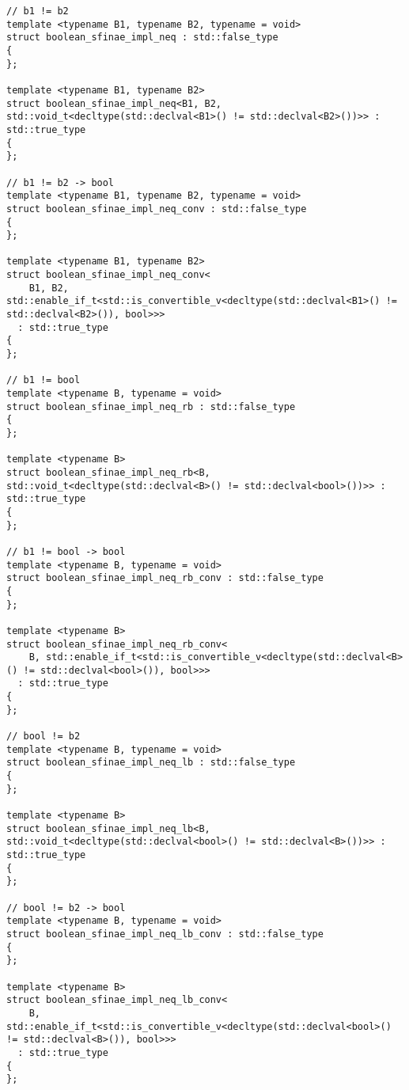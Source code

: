 \begin{verbatim}
// b1 != b2
template <typename B1, typename B2, typename = void>
struct boolean_sfinae_impl_neq : std::false_type
{
};

template <typename B1, typename B2>
struct boolean_sfinae_impl_neq<B1, B2, std::void_t<decltype(std::declval<B1>() != std::declval<B2>())>> : std::true_type
{
};

// b1 != b2 -> bool
template <typename B1, typename B2, typename = void>
struct boolean_sfinae_impl_neq_conv : std::false_type
{
};

template <typename B1, typename B2>
struct boolean_sfinae_impl_neq_conv<
    B1, B2, std::enable_if_t<std::is_convertible_v<decltype(std::declval<B1>() != std::declval<B2>()), bool>>>
  : std::true_type
{
};

// b1 != bool
template <typename B, typename = void>
struct boolean_sfinae_impl_neq_rb : std::false_type
{
};

template <typename B>
struct boolean_sfinae_impl_neq_rb<B, std::void_t<decltype(std::declval<B>() != std::declval<bool>())>> : std::true_type
{
};

// b1 != bool -> bool
template <typename B, typename = void>
struct boolean_sfinae_impl_neq_rb_conv : std::false_type
{
};

template <typename B>
struct boolean_sfinae_impl_neq_rb_conv<
    B, std::enable_if_t<std::is_convertible_v<decltype(std::declval<B>() != std::declval<bool>()), bool>>>
  : std::true_type
{
};

// bool != b2
template <typename B, typename = void>
struct boolean_sfinae_impl_neq_lb : std::false_type
{
};

template <typename B>
struct boolean_sfinae_impl_neq_lb<B, std::void_t<decltype(std::declval<bool>() != std::declval<B>())>> : std::true_type
{
};

// bool != b2 -> bool
template <typename B, typename = void>
struct boolean_sfinae_impl_neq_lb_conv : std::false_type
{
};

template <typename B>
struct boolean_sfinae_impl_neq_lb_conv<
    B, std::enable_if_t<std::is_convertible_v<decltype(std::declval<bool>() != std::declval<B>()), bool>>>
  : std::true_type
{
};



\end{verbatim}
